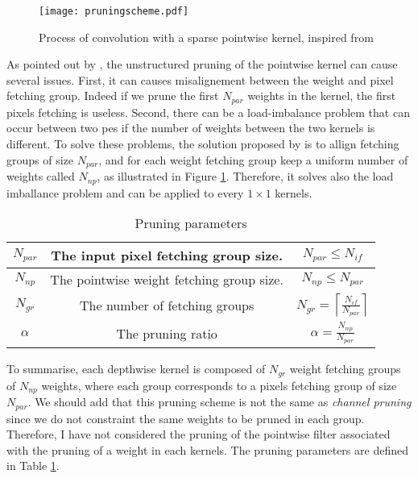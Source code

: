 %
\begin{figure}
    \centering
    \texttt{[image: pruningscheme.pdf]}
    \caption{Process of convolution with a sparse pointwise kernel, inspired from \cite{kang_accelerator-aware_2020}}
    \label{fig:prunedwg}
\end{figure}
%
As pointed out by \cite{kang_accelerator-aware_2020}, the unstructured pruning of the pointwise kernel can cause several issues. First, it can causes misalignement between the weight and pixel fetching group. Indeed if we prune the first $N_{par}$ weights in the kernel, the first pixels fetching is useless. Second, there can be a load-imbalance problem that can occur between two \acrshort{pe}s if the number of weights between the two kernels is different. To solve these problems, the solution proposed by \cite{kang_accelerator-aware_2020} is to allign fetching groups of size $N_{par}$, and for each weight fetching group keep a uniform number of weights called $N_{np}$, as illustrated in Figure \ref{fig:prunedwg}. Therefore, it solves also the load imballance problem and can be applied to every $1 \times 1$ kernels.

%
\begin{table}
    \center
    \begin{tabular}{|c|c|c|}
        \hline
        $N_{par}$ & The input pixel fetching group size. & $N_{par} \leq N_{if}$ \\
        \hline
        $N_{np}$  & The pointwise weight fetching group size. & $N_{np} \leq N_{par}$ \\
        \hline
        $N_{gr}$  & The number of fetching groups & $N_{gr} = \left\lceil \frac{N_{if}}{N_{par}} \right\rceil $ \\
        \hline
        $\alpha$  & The pruning ratio & $\alpha = \frac{N_{np}}{N_{par}}  $ \\
        \hline
    \end{tabular}
    \caption{Pruning parameters}
    \label{tab:pr_param}
\end{table}
%
To summarise, each depthwise kernel is composed of $N_{gr}$ weight fetching groups of $N_{np}$ weights, where each group corresponds to a pixels fetching group of size $N_{par}$. We should add that this pruning scheme is not the same as \textit{channel pruning} since we do not constraint the same weights to be pruned in each group. Therefore, I have not considered the pruning of the pointwise filter associated with the pruning of a weight in each kernels. The pruning parameters are defined in Table \ref{tab:pr_param}.
%
